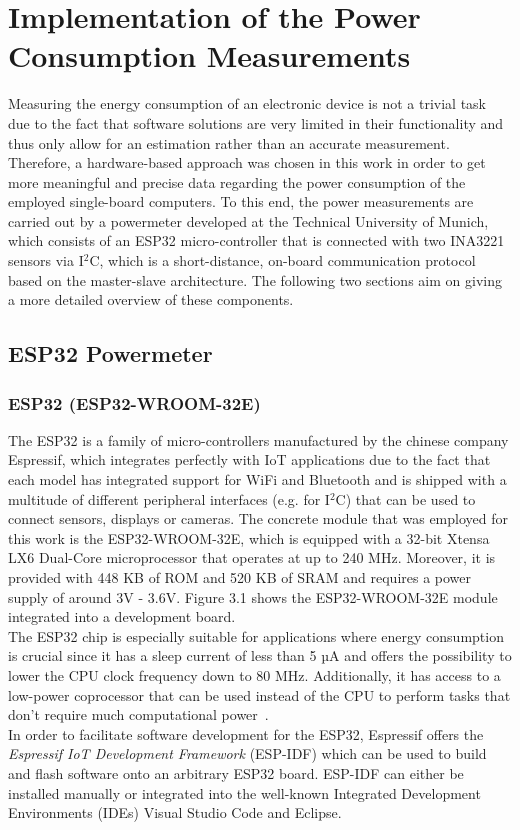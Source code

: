 \section{Implementation of the Power Consumption Measurements}
Measuring the energy consumption of an electronic device is not a trivial task due to the fact that software solutions are very limited in their functionality and thus only allow for an estimation rather than an accurate measurement. Therefore, a hardware-based approach was chosen in this work in order to get more meaningful and precise data regarding the power consumption of the employed single-board computers. To this end, the power measurements are carried out by a powermeter developed at the Technical University of Munich, which consists of an ESP32 micro-controller that is connected with two INA3221 sensors via I$^{2}$C, which is a short-distance, on-board communication protocol based on the master-slave architecture. The following two sections aim on giving a more detailed overview of these components.

\subsection{ESP32 Powermeter}

\subsubsection{ESP32 (ESP32-WROOM-32E)}
The ESP32 is a family of micro-controllers manufactured by the chinese company Espressif, which integrates perfectly with IoT applications due to the fact that each model has integrated support for WiFi and Bluetooth and is shipped with a multitude of different peripheral interfaces (e.g. for I$^{2}$C) that can be used to connect sensors, displays or cameras. The concrete module that was employed for this work is the ESP32-WROOM-32E, which is equipped with a 32-bit Xtensa LX6 Dual-Core microprocessor that operates at up to 240 MHz. Moreover, it is provided with 448 KB of ROM and 520 KB of SRAM and requires a power supply of around 3V - 3.6V. Figure 3.1 shows the ESP32-WROOM-32E module integrated into a development board.\\
The ESP32 chip is especially suitable for applications where energy consumption is crucial since it has a sleep current of less than 5 µA and offers the possibility to lower the CPU clock frequency down to 80 MHz. Additionally, it has access to a low-power coprocessor that can be used instead of the CPU to perform tasks that don't require much computational power~\parencite{esp32-manual}.\\
In order to facilitate software development for the ESP32, Espressif offers the \textit{Espressif IoT Development Framework} (ESP-IDF) which can be used to build and flash software onto an arbitrary ESP32 board. ESP-IDF can either be installed manually or integrated into the well-known Integrated Development Environments (IDEs) Visual Studio Code and Eclipse.

